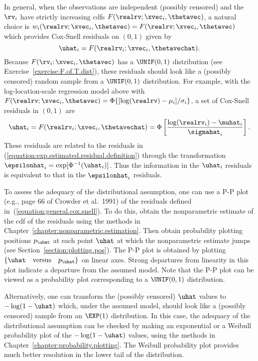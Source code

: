 In general, when the observations are independent (possibly
censored) and the $\rv_{i}$ have strictly increasing cdfs
$F(\realrv; \xvec_{i}, \thetavec)$, a natural choice is
$w_{i}(\realrv;\xvec_{i},\thetavec)= F(\realrv; \xvec_{i},
\thetavec)$ which provides Cox-Snell residuals on $(0,1)$ given by
\begin{equation}
\label{equation:general.cox.snell}
\uhat_{i}=F(\realrv_{i};\xvec_{i}, \thetavechat).
\end{equation}
Because
$F(\rv_{i};\xvec_{i}, \thetavec)$ has a $\UNIF(0,1)$ distribution (see
Exercise~\ref{exercise:F.of.T.dist}), these residuals should look
like a (possibly censored) random sample from a $\UNIF(0,1)$
distribution.  For
example, with the log-location-scale regression model above with 
$F(\realrv;\xvec_{i},\thetavec)=
\Phi\{[\log(\realrv)-\mu_{i}]/\sigma_{i}\}$, a set of Cox-Snell residuals
in $(0,1)$  are 
\begin{displaymath}
\uhat_{i}=F(\realrv_{i};\xvec_{i}, \thetavechat)=
\Phi\left[
\frac{
\log(\realrv_{i})-\muhat_{i}
     }
     {
\sigmahat_{i}
     }
\right ].
\end{displaymath}
These residuals are related to the residuals in
(\ref{equation:exp.estimated.residual.definition}) through the
transformation $\epsilonhat_{i}=\exp[\Phi^{-1}(\uhat_{i})]$.  Thus
the information in the $\uhat_{i}$ residuals is equivalent to that
in the $\epsilonhat_{i}$ residuals.

To assess the adequacy of the distributional assumption, one can use
a P-P plot (e.g., page 66 of Crowder et al.~1991) of the residuals
defined in~(\ref{equation:general.cox.snell}).  To do this, obtain
the nonparametric estimate of the cdf of the residuals using the
methods in Chapter~\ref{chapter:nonparametric.estimation}.  Then
obtain probability plotting positions $p_{\uhat}$ at each point
$\uhat$ at which the nonparametric estimate jumps (see
Section~\ref{section:plotting.pos}).  The P-P plot is obtained by
plotting $\{\uhat \quad \mbox{versus} \quad p_{\uhat} \}$ on linear
axes.  Strong departures from linearity in this plot indicate a
departure from the assumed model.  Note that the P-P plot can be
viewed as a probability plot corresponding to a $\UNIF(0,1)$
distribution.

Alternatively, one can transform the (possibly censored) $\uhat$
values to $-\log(1-\uhat)$ which, under the assumed model, should
look like a (possibly censored) sample from an $\EXP(1)$
distribution. In this case, the adequacy of the distributional
assumption can be checked by making an exponential or a Weibull
probability plot of the $-\log(1-\uhat)$ values, using the methods in
Chapter~\ref{chapter:probability.plotting}.  The Weibull probability
plot provides much better resolution in the lower tail of the
distribution.

